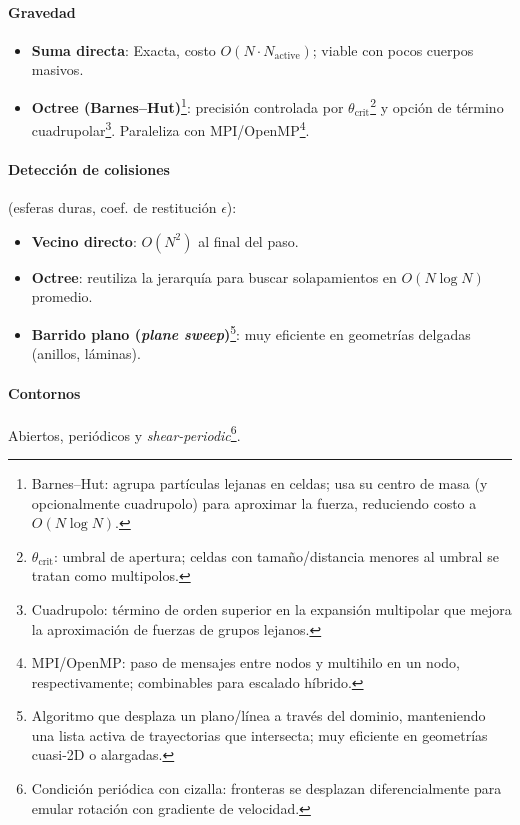 \paragraph{Gravedad}
\begin{itemize}
  \item \textbf{Suma directa}: Exacta, costo $O(N\cdot N_{\text{active}})$; viable con pocos cuerpos masivos.
  \item \textbf{Octree (Barnes–Hut)}\footnote{Barnes–Hut: agrupa partículas lejanas en celdas; usa su centro de masa (y opcionalmente cuadrupolo) para aproximar la fuerza, reduciendo costo a $O(N\log N)$.}: precisión controlada por $\theta_{\text{crit}}$\footnote{$\theta_{\text{crit}}$: umbral de apertura; celdas con tamaño/distancia menores al umbral se tratan como multipolos.} y opción de término cuadrupolar\footnote{Cuadrupolo: término de orden superior en la expansión multipolar que mejora la aproximación de fuerzas de grupos lejanos.}. Paraleliza con MPI/OpenMP\footnote{MPI/OpenMP: paso de mensajes entre nodos y multihilo en un nodo, respectivamente; combinables para escalado híbrido.}.
\end{itemize}

\paragraph{Detección de colisiones} (esferas duras, coef. de restitución $\epsilon$):
\begin{itemize}
  \item \textbf{Vecino directo}: $O(N^2)$ al final del paso.
  \item \textbf{Octree}: reutiliza la jerarquía para buscar solapamientos en $O(N\log N)$ promedio.
  \item \textbf{Barrido plano (\emph{plane sweep})}\footnote{Algoritmo que desplaza un plano/línea a través del dominio, manteniendo una lista activa de trayectorias que intersecta; muy eficiente en geometrías cuasi-2D o alargadas.}: muy eficiente en geometrías delgadas (anillos, láminas).
\end{itemize}

\paragraph{Contornos}
Abiertos, periódicos y \emph{shear-periodic}\footnote{Condición periódica con cizalla: fronteras se desplazan diferencialmente para emular rotación con gradiente de velocidad.}.

